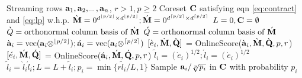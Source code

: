 \begin{algorithm}[htpb]
\caption{}{\label{alg:slowOnline}}
\begin{algorithmic}
\REQUIRE Streaming rows $\mathbf{a}_{1}, \mathbf{a}_{2}, _{\cdots}, \mathbf{a}_{n}$, $r>1, p\geq2$
\ENSURE Coreset $\mathbf{C}$ satisfying eqn \eqref{eq:contract} and \eqref{eq:lp} w.h.p.
\STATE $\grave{\mathbf{M}} = 0^{d^{\lfloor p/2 \rfloor} \times d^{\lfloor p/2 \rfloor}};\acute{\mathbf{M}} = 0^{d^{\lceil p/2 \rceil} \times d^{\lceil p/2 \rceil}}$
\STATE $L=0, \mathbf{C}= \emptyset$
\STATE $\grave{Q} = \mbox{orthonormal column basis of }\grave{\mathbf{M}}$
\STATE $\acute{Q} = \mbox{orthonormal column basis of }\acute{\mathbf{M}}$
\STATE $\grave{\mathbf{a}}_{i} = \mbox{vec}(\mathbf{a}_{i}\otimes^{\lfloor p/2 \rfloor}); \acute{\mathbf{a}}_{i} = \mbox{vec}(\mathbf{a}_{i}\otimes^{\lceil p/2 \rceil})$
\STATE $[\grave{e}_{i}, \grave{\mathbf{M}}, \grave{\mathbf{Q}}]$ = OnlineScore($\grave{\mathbf{a}}_{i},\grave{\mathbf{M}},\grave{\mathbf{Q}},p,r$)
\STATE $[\acute{e}_{i}, \acute{\mathbf{M}}, \acute{\mathbf{Q}}]$ = OnlineScore($\acute{\mathbf{a}}_{i},\acute{\mathbf{M}},\acute{\mathbf{Q}},p,r$)
\STATE $\tilde{l}_{i} = (\grave{e}_{i})^{1/2}; \acute{l}_{i} = (\acute{e}_{i})^{1/2}$
\STATE $\tilde{l}_{i} = \grave{l}_{i}\acute{l}_{i}; L = L+\tilde{l}_{i}; p_{i} = \min\{r\tilde{l}_{i}/L,1\}$
\STATE Sample $\mathbf{a}_{i}/\sqrt[p]{p_{i}}$ in $\mathbf{C}$ with probability $p_{i}$
\ENDWHILE
\end{algorithmic}
\end{algorithm}

